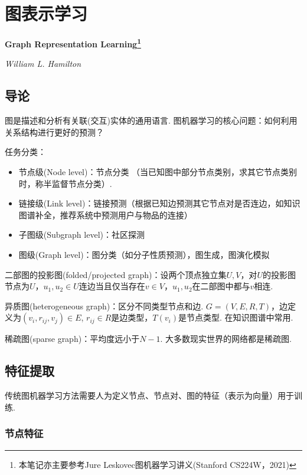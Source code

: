 
\chapter{图表示学习}
\Large\textbf{Graph Representation Learning\footnote{本笔记亦主要参考Jure Leskovec图机器学习讲义(Stanford CS224W，2021)}}
\par \emph{William L. Hamilton} \normalsize

\section{导论}

\par 图是描述和分析有关联(交互)实体的通用语言. 图机器学习的核心问题：如何利用关系结构进行更好的预测？

\par 任务分类：
\begin{itemize}
    \item 节点级(Node level)：节点分类 （当已知图中部分节点类别，求其它节点类别时，称半监督节点分类）. 
    \item 链接级(Link level)：链接预测（根据已知边预测其它节点对是否连边，如知识图谱补全，推荐系统中预测用户与物品的连接）
    \item 子图级(Subgraph level)：社区探测
    \item 图级(Graph level)：图分类（如分子性质预测），图生成，图演化模拟
\end{itemize}

\par 二部图的投影图(folded/projected graph)：设两个顶点独立集$U,V$，对$U$的投影图节点为$U$，$u_1,u_2\in U$连边当且仅当存在$v\in V$，$u_1,u_2$在二部图中都与$v$相连. 

\par 异质图(heterogeneous graph)：区分不同类型节点和边.  $G=(V,E,R,T)$，边定义为$(v_i,r_{ij},v_j)\in E$, $r_{ij}\in R$是边类型，$T(v_i)$是节点类型. 在知识图谱中常用. 

\par 稀疏图(sparse graph)：平均度远小于$N-1$. 大多数现实世界的网络都是稀疏图. 

\section{特征提取}

\par 传统图机器学习方法需要人为定义节点、节点对、图的特征（表示为向量）用于训练. 

\subsection{节点特征}

